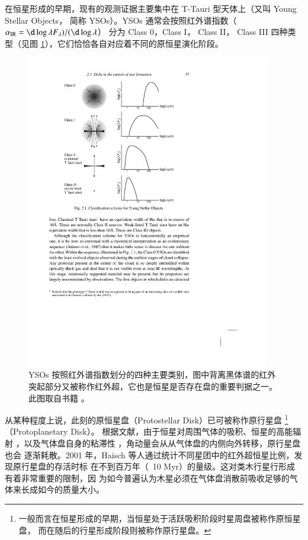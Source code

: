 在恒星形成的早期，现有的观测证据主要集中在 T-Tauri 型天体上（又叫 Young Stellar Objects，
简称 YSOs）。YSOs 通常会按照红外谱指数（$\alpha_\tif{IR} = \d\log \lambda F_\lambda)/(\d\log \lambda$）
分为 Class 0，Class \RN{1}， Class \RN{2}， Class \RN{3} 四种类型\cite{Andreetal2000}（见图
 \ref{fig:ysostage}），它们恰恰各自对应着不同的原恒星演化阶段。

\begin{figure}[t]
\centering
\includegraphics[width=0.95\textwidth]{figures/chapter1/fig9_ysostages.pdf}
\caption[YSOs 按照红外谱指数划分的四种主要类别，版权所有：Armitage P.。]{YSOs 按照红外谱指数划分的四种主要类别，图中背离黑体谱的红外突起部分又被称作红外超，它也是恒星是否存在盘的重要判据之一。此图取自书籍 。}
\label{fig:ysostage}
\end{figure}

从某种程度上说，此刻的原恒星盘（Protostellar Disk）已可被称作原行星盘
\footnote{一般而言在恒星形成的早期，当恒星处于活跃吸积阶段时星周盘被称作原恒星盘，
而在随后的行星形成阶段则被称作原行星盘。}（Protoplanetary Disk）。
根据文献，由于恒星对周围气体的吸积\cite{Pringle1981}、恒星的高能辐射
\cite{Johnstone1998,Hollenbach1994}，以及气体盘自身的粘滞性
\cite{Shakura1973,Gammie1996}，角动量会从从气体盘的内侧向外转移，原行星盘也会
逐渐耗散。2001 年，Haisch 等人通过统计不同星团中的红外超恒星比例，发现原行星盘的存活时标
在不到百万年（~10 Myr）的量级\cite{Haisch2001}。这对类木行星行形成有着非常重要的限制，因
为如今普遍认为木星必须在气体盘消散前吸收足够的气体来长成如今的质量大小\cite{WilliamsCieza2011}。

